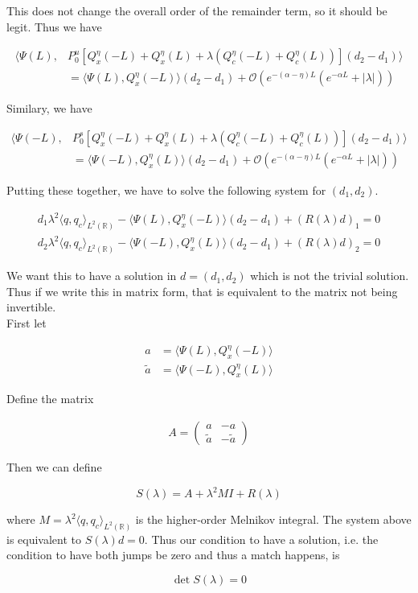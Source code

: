 \documentclass[12pt]{article}
\def\R{{\mathbb R}}
\begin{document}
This does not change the overall order of the remainder term, so it should be legit. Thus we have

\begin{align*}
\langle \Psi(L), &P_0^u [Q^\eta_x(-L) + Q^\eta_x(L) + 
\lambda(Q^\eta_c(-L) + Q^\eta_c(L))](d_2 - d_1) \rangle \\
&= \langle \Psi(L), Q^\eta_x(-L) \rangle (d_2 - d_1) + \mathcal{O}(e^{-(\alpha - \eta) L}(e^{-\alpha L} + |\lambda|))
\end{align*}

Similary, we have

\begin{align*}
\langle \Psi(-L), &P_0^s [Q^\eta_x(-L) + Q^\eta_x(L) + 
\lambda(Q^\eta_c(-L) + Q^\eta_c(L))](d_2 - d_1) \rangle \\
&= \langle \Psi(-L), Q^\eta_x(L) \rangle (d_2 - d_1) + \mathcal{O}(e^{-(\alpha - \eta) L}(e^{-\alpha L} + |\lambda|))
\end{align*}


Putting these together, we have to solve the following system for $(d_1, d_2)$.

\begin{align*}
d_1 \lambda^2 \langle q, q_c \rangle_{L^2(\R)} - \langle \Psi(L), Q^\eta_x(-L) \rangle (d_2 - d_1)  + (R(\lambda)d)_1 = 0\\
d_2 \lambda^2 \langle q, q_c \rangle_{L^2(\R)} - \langle \Psi(-L), Q^\eta_x(L) \rangle (d_2 - d_1)  + (R(\lambda)d)_2 = 0
\end{align*}

We want this to have a solution in $d = (d_1, d_2)$ which is not the trivial solution. Thus if we write this in matrix form, that is equivalent to the matrix not being invertible.\\

First let

\begin{align*}
a &= \langle \Psi(L), Q^\eta_x(-L) \rangle \\
\tilde{a} &= \langle \Psi(-L), Q^\eta_x(L) \rangle
\end{align*}

Define the matrix

\begin{align*}
A = \begin{pmatrix}
a & -a \\ \tilde{a} & -\tilde{a} 
\end{pmatrix}
\end{align*}

Then we can define

\[
S(\lambda) = A + \lambda^2 MI + R(\lambda) 
\]

where $M = \lambda^2 \langle q, q_c \rangle_{L^2(\R)}$ is the higher-order Melnikov integral. The system above is equivalent to $S(\lambda)d = 0$. Thus our condition to have a solution, i.e. the condition to have both jumps be zero and thus a match happens, is

\[
\det S(\lambda) = 0
\]
\end{document}
